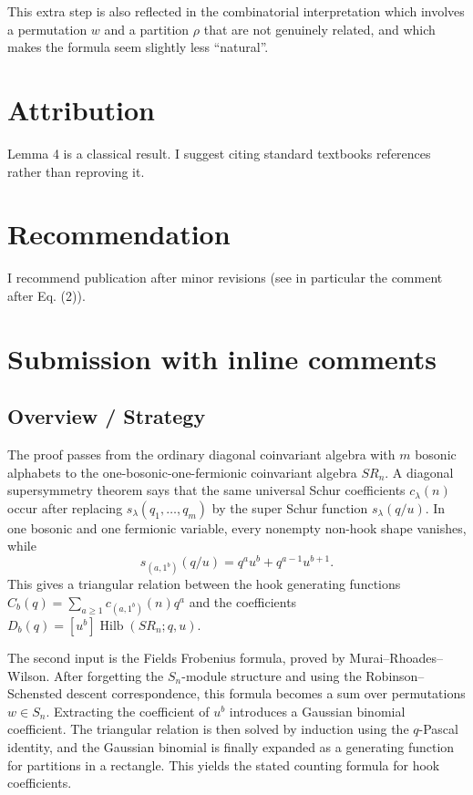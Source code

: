 \documentclass[12pt]{article}
\DeclareMathOperator{\Hilb}{Hilb}
\begin{document}
This extra step is also reflected in the combinatorial interpretation which involves a permutation $w$ and a partition $\rho$ that are not genuinely related, and which makes the formula seem slightly less ``natural''.


\section{Attribution}
Lemma 4 is a classical result. I suggest citing standard textbooks references rather than reproving it.


\section{Recommendation}
I recommend publication after minor revisions (see in particular the comment after Eq. (2)).

  \section{Submission with inline comments}


\date{}


\subsection*{Overview / Strategy}

The proof passes from the ordinary diagonal coinvariant algebra with \(m\) bosonic alphabets to the one-bosonic-one-fermionic coinvariant algebra \(SR_n\).  A diagonal supersymmetry theorem says that the same universal Schur coefficients \(c_\lambda(n)\) occur after replacing \(s_\lambda(q_1,\ldots,q_m)\) by the super Schur function \(s_\lambda(q/u)\).  In one bosonic and one fermionic variable, every nonempty non-hook shape vanishes, while
\[
s_{(a,1^b)}(q/u)=q^a u^b+q^{a-1}u^{b+1}.
\]
This gives a triangular relation between the hook generating functions \(C_b(q)=\sum_{a\ge 1}c_{(a,1^b)}(n)q^a\) and the coefficients \(D_b(q)=[u^b]\Hilb(SR_n;q,u)\).

The second input is the Fields Frobenius formula, proved by Murai--Rhoades--Wilson.  After forgetting the \(S_n\)-module structure and using the Robinson--Schensted descent correspondence, this formula becomes a sum over permutations \(w\in S_n\).  Extracting the coefficient of \(u^b\) introduces a Gaussian binomial coefficient.  The triangular relation is then solved by induction using the \(q\)-Pascal identity, and the Gaussian binomial is finally expanded as a generating function for partitions in a rectangle.  This yields the stated counting formula for hook coefficients.
\end{document}
